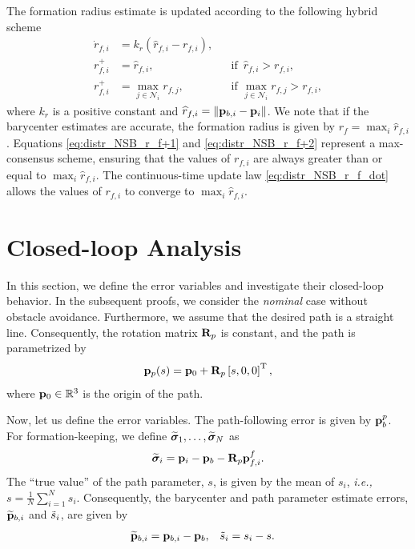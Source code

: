 The formation radius estimate is updated according to the following hybrid scheme
\begin{subequations}
    \begin{align}
        \dot{r}_{f, i} &= k_r \left(\widehat{r}_{f, i} - r_{f, i}\right),& &  \label{eq:distr_NSB_r_f_dot} \\
        r_{f, i}^{+} &= \widehat{r}_{f, i}, & &\text{if }\, \widehat{r}_{f, i} > r_{f, i}, \label{eq:distr_NSB_r_f+1} \\
        r_{f, i}^{+} &= \max_{j \in \mathcal{N}_i} r_{f, j}, & &\text{if } \max_{j \in \mathcal{N}_i} r_{f, j} > r_{f, i}, \label{eq:distr_NSB_r_f+2}
    \end{align}
\end{subequations}
where $k_r$ is a positive constant and $\widehat{r}_{f, i} = \left\|\mathbf{p}_{b, i} - \mathbf{p}_i\right\|$.
We note that if the barycenter estimates are accurate, the formation radius is given by $r_f = \max_i \widehat{r}_{f, i}$.
Equations \eqref{eq:distr_NSB_r_f+1} and \eqref{eq:distr_NSB_r_f+2} represent a max-consensus scheme, ensuring that the values of $r_{f, i}$ are always greater than or equal to $\max_i \widehat{r}_{f, i}$.
The continuous-time update law \eqref{eq:distr_NSB_r_f_dot} allows the values of $r_{f, i}$ to converge to $\max_i \widehat{r}_{f, i}$.

\section{Closed-loop Analysis}
\label{sec:distr_NSB_closed_loop}
In this section, we define the error variables and investigate their closed-loop behavior.
In the subsequent proofs, we consider the \emph{nominal} case without obstacle avoidance.
Furthermore, we assume that the desired path is a straight line. %
Consequently, the rotation matrix $\mathbf{R}_p$ is constant, and the path is parametrized by
\begin{equation}
    \mathbf{p}_p(s) = \mathbf{p}_0 + \mathbf{R}_p \left[s, 0, 0\right]^{\mathrm{T}},
    \label{eq:distr_NSB_straight_line}
\end{equation}
where $\mathbf{p}_0 \in \mathbb{R}^3$ is the origin of the path.

Now, let us define the error variables.
The path-following error is given by $\mathbf{p}_b^p$.
For formation-keeping, we define $\widetilde{\bm{\sigma}}_1, \ldots, \widetilde{\bm{\sigma}}_N$ as
\begin{equation}
    \widetilde{\bm{\sigma}}_i = \mathbf{p}_i - \mathbf{p}_b - \mathbf{R}_p \mathbf{p}_{f, i}^f.
    \label{eq:distr_NSB_formation_errors}
\end{equation}    
The ``true value'' of the path parameter, $s$, is given by the mean of $s_i$, \emph{i.e.,} $s = \frac{1}{N} \sum_{i=1}^N s_i$.
Consequently, the barycenter and path parameter estimate errors, $\widetilde{\mathbf{p}}_{b, i}$ and $\Tilde{s}_{i}$, are given by
\begin{align}
    \widetilde{\mathbf{p}}_{b, i} &= \mathbf{p}_{b, i} - \mathbf{p}_b, &
    \Tilde{s}_{i} &= s_i - s. \label{eq:distr_NSB_consensus_errors}
\end{align}

